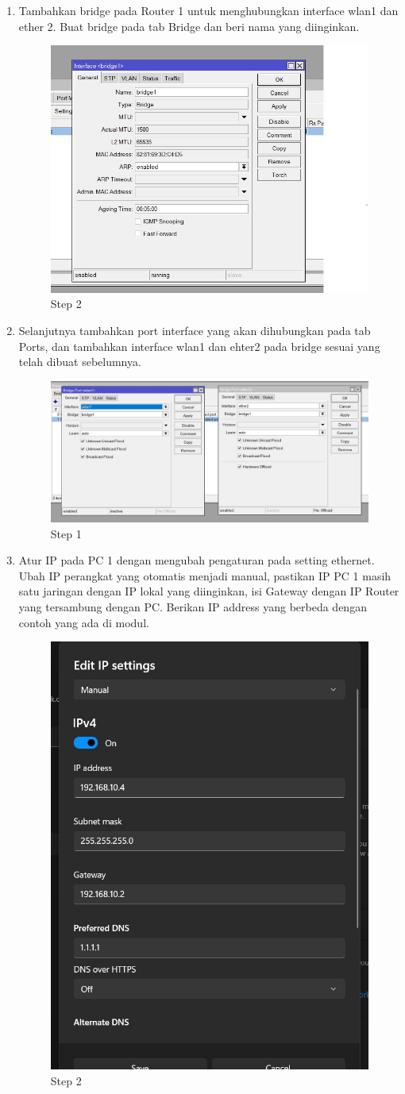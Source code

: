 \begin{enumerate}
	\item Tambahkan bridge pada Router 1 untuk menghubungkan interface wlan1 dan ether 2. Buat
	bridge pada tab Bridge dan beri nama yang diinginkan.	
	\begin{figure}[H]
		\centering
		\includegraphics[width=0.5\linewidth]{P1/img/per3pc1step4.jpg}
		\caption{Step 2}
		\label{fig:gambar19}
	\end{figure}

	\item Selanjutnya tambahkan port interface yang akan dihubungkan pada tab Ports, dan tambahkan
	interface wlan1 dan ehter2 pada bridge sesuai yang telah dibuat sebelumnya.
	\begin{figure}[H]
		\centering
		\includegraphics[width=0.5\linewidth]{P1/img/per3pc1step5.jpg}
		\caption{Step 1}
		\label{fig:gambar20}
	\end{figure}

	\item Atur IP pada PC 1 dengan mengubah pengaturan pada setting ethernet. Ubah IP perangkat
	yang otomatis menjadi manual, pastikan IP PC 1 masih satu jaringan dengan IP lokal yang
	diinginkan, isi Gateway dengan IP Router yang tersambung dengan PC. Berikan IP address
	yang berbeda dengan contoh yang ada di modul.
	\begin{figure}[H]
		\centering
		\includegraphics[width=0.5\linewidth]{P1/img/per3pc1step6.jpg}
		\caption{Step 2}
		\label{fig:gambar21}
	\end{figure}


\end{enumerate}
